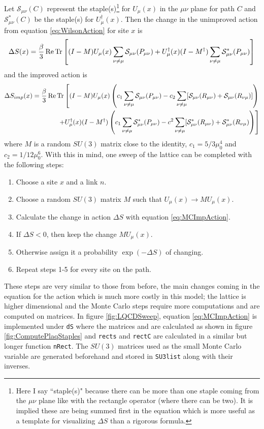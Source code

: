 \documentclass[11pt]{article}
\begin{document}
Let $\mathcal{S}_{\mu\nu}(C)$ represent the staple(s)\footnote{Here I say ``staple(s)" because there can be more than one staple coming from the $\mu\nu$ plane like with the rectangle operator (where there can be two). It is implied these are being summed first in the equation which is more useful as a template for visualizing $\Delta S$ than a rigorous formula.} for $U_\mu(x)$ in the $\mu\nu$ plane for path $C$ and $\mathcal{S}^*_{\mu\nu}(C)$ be the staple(s) for $U_\mu^\dagger(x)$. Then the change in the unimproved action from equation \ref{eq:WilsonAction} for site $x$ is
\begin{align}
	\Delta S(x)=\frac{\beta}{3}\Re\Trace\left[(I-M)U_\mu(x)\sum_{\nu\neq\mu}\mathcal{S}_{\mu\nu}(P_{\mu\nu})+U^\dagger_\mu(x)(I-M^\dagger)\sum_{\nu\neq\mu}\mathcal{S}^*_{\mu\nu}(P_{\mu\nu})\right]
	\label{eq:MCNormAction}
\end{align}
and the improved action is
\begin{align}
\begin{split}
	\Delta S_{imp}(x)=\frac{\beta}{3}\Re\Trace\left[(I-M)U_\mu(x)\left(c_1\sum_{\nu\neq\mu}\mathcal{S}_{\mu\nu}(P_{\mu\nu})-c_2\sum_{\nu\neq\mu}[\mathcal{S}_{\mu\nu}(R_{\mu\nu})+\mathcal{S}_{\mu\nu}(R_{\nu\mu})]\right)\right.\\
	\left.+U^\dagger_\mu(x)(I-M^\dagger)\left(c_1\sum_{\nu\neq\mu}\mathcal{S}^*_{\mu\nu}(P_{\mu\nu})-c^2\sum_{\nu\neq\mu}[\mathcal{S}^*_{\mu\nu}(R_{\mu\nu})+\mathcal{S}^*_{\mu\nu}(R_{\nu\mu})\right)\right]
\end{split}
	\label{eq:MCImpAction}
\end{align}
where $M$ is a random $SU(3)$ matrix close to the identity, $c_1=5/3\mu_0^4$ and $c_2=1/12\mu_0^6$. With this in mind, one sweep of the lattice can be completed with the following steps:
\begin{enumerate}
\item Choose a site $x$ and a link $n$.
\item Choose a random $SU(3)$ matrix $M$ such that $U_\mu(x)\to MU_\mu(x)$.
\item Calculate the change in action $\Delta S$ with equation \ref{eq:MCImpAction}.
\item If $\Delta S<0$, then keep the change $MU_\mu(x)$.
\item Otherwise assign it a probability $\exp(-\Delta S)$ of changing.
\item Repeat steps 1-5 for every site on the path.
\end{enumerate}
These steps are very similar to those from before, the main changes coming in the equation for the action which is much more costly in this model; the lattice is higher dimensional and the Monte Carlo steps require more computations and are computed on matrices. In figure \ref{fig:LQCDSweep}, equation \ref{eq:MCImpAction} is implemented under \texttt{dS} where the matrices  and  are calculated as shown in figure \ref{fig:ComputePlaqStaples} and \texttt{rects} and \texttt{rectC} are calculated in a similar but longer function \texttt{nRect}. The $SU(3)$ matrices used as the small Monte Carlo variable are generated beforehand and stored in \texttt{SU3list} along with their inverses.
\end{document}
